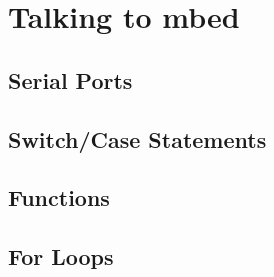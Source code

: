 \section{Talking to mbed}
\label{sec:talking}

\subsection{Serial Ports}
\label{sub:uart}


\subsection{Switch/Case Statements}
\label{sub:switch_case}


\subsection{Functions}
\label{sub:functions}


\subsection{For Loops}
\label{sub:for_loops}
